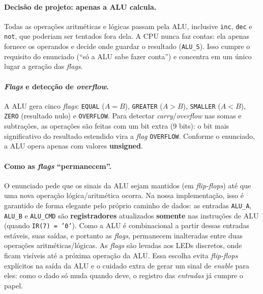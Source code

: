 \documentclass[12pt,a4paper]{article}
\begin{document}
\paragraph{Decisão de projeto: apenas a ALU calcula.}
Todas as operações aritméticas e lógicas passam pela ALU, inclusive \texttt{inc},
\texttt{dec} e \texttt{not}, que poderiam ser tentados fora dela. A CPU nunca faz contas:
ela apenas fornece os operandos e decide onde guardar o resultado (\texttt{ALU\_S}). Isso
cumpre o requisito do enunciado (``só a ALU sabe fazer conta'') e concentra em um único
lugar a geração das \textit{flags}.

\paragraph{\textit{Flags} e detecção de \textit{overflow}.}
A ALU gera cinco \textit{flags}: \texttt{EQUAL} ($A = B$), \texttt{GREATER} ($A > B$),
\texttt{SMALLER} ($A < B$), \texttt{ZERO} (resultado nulo) e \texttt{OVERFLOW}. Para
detectar \textit{carry}/\textit{overflow} nas somas e subtrações, as operações são feitas
com um bit extra (9 bits): o bit mais significativo do resultado estendido vira a
\textit{flag} \texttt{OVERFLOW}. Conforme o enunciado, a ALU opera apenas com valores
\textbf{unsigned}.

\paragraph{Como as \textit{flags} ``permanecem''.}
O enunciado pede que os sinais da ALU sejam mantidos (em \textit{flip-flops}) até que uma
nova operação lógica/aritmética ocorra. Na nossa implementação, isso é garantido de forma
elegante pelo próprio caminho de dados: as entradas \texttt{ALU\_A}, \texttt{ALU\_B} e
\texttt{ALU\_CMD} são \textbf{registradores} atualizados \textbf{somente} nas instruções de
ALU (quando \texttt{IR(7) = '0'}). Como a ALU é combinacional a partir dessas entradas
estáveis, suas saídas, e portanto as \textit{flags}, permanecem inalteradas entre
duas operações aritméticas/lógicas. As \textit{flags} são levadas aos LEDs discretos, onde
ficam visíveis até a próxima operação da ALU. Essa escolha evita \textit{flip-flops}
explícitos na saída da ALU e o cuidado extra de gerar um sinal de \textit{enable} para eles:
como o dado só muda quando deve, o registro das \emph{entradas} já cumpre o papel.
\end{document}
